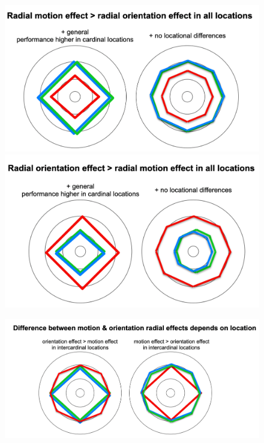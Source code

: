 \documentclass[11pt]{article} %
\begin{document}
	\begin{figure}[H]
	\centering %
	\includegraphics[scale=.25]{Images/Cartoon2.png}
	\includegraphics[scale=.25]{Images/Cartoon3.png}
	\end{figure}
	\begin{figure}[H]
	\centering %
	\includegraphics[scale=.25]{Images/Cartoon4.png}
	\end{figure}
	
\newpage
\end{document}
